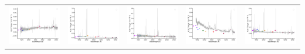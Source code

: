 \begin{center}
\begin{longtable}{l l l l l }
    \includegraphics[width=0.2\linewidth, clip]{Figs/Figs-sdss/spec-1086-52525-0146-STRIPE82-0013-036763.pdf} & \includegraphics[width=0.2\linewidth, clip]{Figs/Figs-sdss/spec-1114-53179-0599-STRIPE82-0110-008449.pdf} & \includegraphics[width=0.2\linewidth, clip]{Figs/Figs-sdss/spec-1476-52964-0017-SPLUS-s02s08-040860.pdf} & \includegraphics[width=0.2\linewidth, clip]{Figs/Figs-sdss/spec-1827-53531-0289-SPLUS-n05n50-033851.pdf} & \includegraphics[width=0.2\linewidth, clip]{Figs/Figs-sdss/spec-3589-55186-0374-STRIPE82-0015-013616.pdf} \\

\end{longtable}
\end{center}
